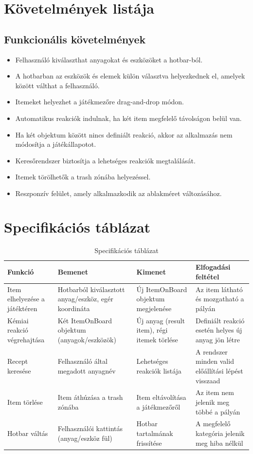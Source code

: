 \documentclass[]{thesis-ekf}
\begin{document}
	\section{Követelmények listája} 
	\subsection{Funkcionális követelmények}
	\begin{itemize}
		\item Felhasználó kiválaszthat anyagokat és eszközöket a hotbar-ból.
		\item A hotbarban az eszközök és elemek külön választva helyezkednek el, amelyek között válthat a felhasználó.
		\item Itemeket helyezhet a játékmezőre drag-and-drop módon.
		\item Automatikus reakciók indulnak, ha két item megfelelő távolságon belül van.
		\item Ha két objektum között nincs definiált reakció, akkor az alkalmazás nem módosítja a játékállapotot.
		\item Keresőrendszer biztosítja a lehetséges reakciók megtalálását.
		\item Itemek törölhetők a trash zónába helyezéssel.
		\item Reszponzív felület, amely alkalmazkodik az ablakméret változásához.
	\end{itemize}
	\section{Specifikációs táblázat}
	
	\begin{table}[h!]
		\centering
		\footnotesize
		\begin{tabular}{|p{3.5cm}|p{3.5cm}|p{3.5cm}|p{4cm}|}
			\hline
			\textbf{Funkció} & \textbf{Bemenet} & \textbf{Kimenet} & \textbf{Elfogadási feltétel} \\
			\hline
			Item elhelyezése a játéktéren 
			& Hotbarból kiválasztott anyag/eszköz, egér koordináta 
			& Új ItemOnBoard objektum megjelenése 
			& Az item látható és mozgatható a pályán \\
			\hline
			Kémiai reakció végrehajtása 
			& Két ItemOnBoard objektum (anyagok/eszközök) 
			& Új anyag (result item), régi itemek törlése 
			& Definiált reakció esetén helyes új anyag jön létre \\
			\hline
			Recept keresése 
			& Felhasználó által megadott anyagnév 
			& Lehetséges reakciók listája 
			& A rendszer minden valid előállítási lépést visszaad \\
			\hline
			Item törlése 
			& Item áthúzása a trash zónába 
			& Item eltávolítása a játékmezőről 
			& Az item nem jelenik meg többé a pályán \\
			\hline
			Hotbar váltás 
			& Felhasználói kattintás (anyag/eszköz fül) 
			& Hotbar tartalmának frissítése 
			& A megfelelő kategória jelenik meg hiba nélkül \\
			\hline
		\end{tabular}
		\caption{Specifikációs táblázat}
		\label{tab:specifikacio}
	\end{table}
	
\end{document}
